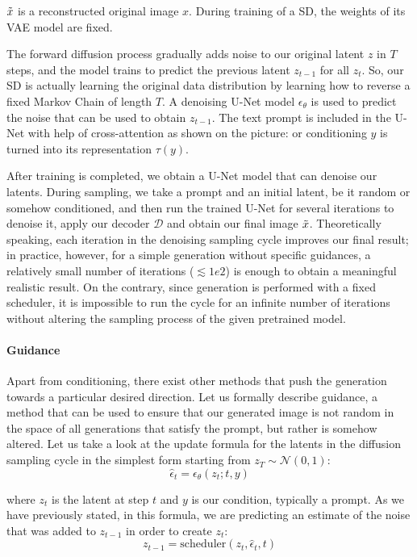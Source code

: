 $\Tilde{x}$ is a reconstructed original image $x$. 
During training of a SD, the weights of its VAE model are fixed.

The forward diffusion process gradually adds noise to our original latent $z$ in $T$ steps, and the model trains to predict the previous latent $z_{t-1}$ for all $z_t$.
So, our SD is actually learning the original data distribution by learning how to reverse a fixed Markov Chain of length $T$.
A denoising U-Net model $\epsilon_\theta$ is used to predict the noise that can be used to obtain $z_{t-1}$.
The text prompt is included in the U-Net with help of cross-attention as shown on the picture: or conditioning $y$ is turned into its representation $\tau(y)$.

After training is completed, we obtain a U-Net model that can denoise our latents.
During sampling, we take a prompt and an initial latent, be it random or somehow conditioned, and then run the trained U-Net for several iterations to denoise it, apply our decoder $\mathcal{D}$ and obtain our final image $\Tilde{x}$.
Theoretically speaking, each iteration in the denoising sampling cycle improves our final result; in practice, however, for a simple generation without specific guidances, a relatively small number of iterations ($\lesssim 1e2$) is enough to obtain a meaningful realistic result.
On the contrary, since generation is performed with a fixed scheduler, it is impossible to run the cycle for an infinite number of iterations without altering the sampling process of the given pretrained model.

\paragraph{Guidance}\label{sec:guidance}
Apart from conditioning, there exist other methods that push the generation towards a particular desired direction.
Let us formally describe guidance, a method that can be used to ensure that our generated image is not random in the space of all generations that satisfy the prompt, but rather is somehow altered.
Let us take a look at the update formula for the latents in the diffusion sampling cycle in the simplest form starting from $z_T \sim \mathcal{N}(0, 1)$:
$$\hat\epsilon_t = \epsilon_\theta(z_t;t,y)$$

where $z_t$ is the latent at step $t$ and $y$ is our condition, typically a prompt.
As we have previously stated, in this formula, we are predicting an estimate of the noise that was added to $z_{t-1}$ in order to create $z_t$:
$$z_{t-1} = \text{scheduler}(z_t, \hat\epsilon_t, t)$$

